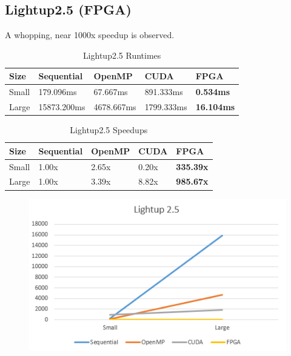 \documentclass{acm_proc_article-sp}
\begin{document}
\subsection{Lightup2.5 (FPGA)}
A whopping, near 1000x speedup is observed.
\begin{table}[H]
\centering
\caption{Lightup2.5 Runtimes}
\begin{tabular}{|l|l|l|l|l|} \hline
Size&Sequential&OpenMP&CUDA&FPGA\\ \hline
Small & 179.096ms & 67.667ms & 891.333ms & \textbf{0.534ms} \\ \hline
Large & 15873.200ms & 4678.667ms & 1799.333ms & \textbf{16.104ms} \\ \hline
\end{tabular}
\end{table}
\begin{table}[H]
\centering
\caption{Lightup2.5 Speedups}
\begin{tabular}{|l|l|l|l|l|} \hline
Size&Sequential&OpenMP&CUDA&FPGA\\ \hline
Small & 1.00x & 2.65x & 0.20x & \textbf{335.39x} \\ \hline
Large & 1.00x & 3.39x & 8.82x & \textbf{985.67x} \\ \hline
\end{tabular}
\end{table}
\begin{figure}[H]
  \includegraphics[width=\linewidth,natwidth=476,natheight=282]{lightup25_comparison.png}
  \label{fig:lightup2.5_comparison}
\end{figure}
\end{document}
